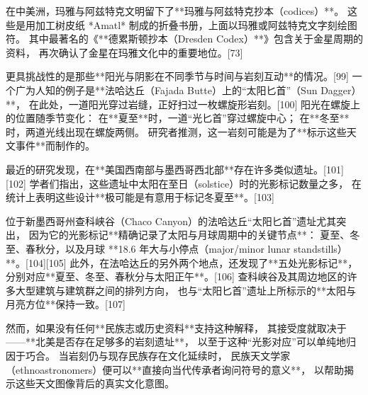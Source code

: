 在中美洲，玛雅与阿兹特克文明留下了**玛雅与阿兹特克抄本（codices）**。
这些是用加工树皮纸 *Amatl* 制成的折叠书册，上面以玛雅或阿兹特克文字刻绘图符。
其中最著名的《**德累斯顿抄本（Dresden Codex）**》包含关于金星周期的资料，
再次确认了金星在玛雅文化中的重要地位。[73]

更具挑战性的是那些**阳光与阴影在不同季节与时间与岩刻互动**的情况。[99]
一个广为人知的例子是**法哈达丘（Fajada Butte）上的“太阳匕首”（Sun Dagger）**，
在此处，一道阳光穿过岩缝，正好扫过一枚螺旋形岩刻。[100]
阳光在螺旋上的位置随季节变化：
在**夏至**时，一道“光匕首”穿过螺旋中心；
在**冬至**时，两道光线出现在螺旋两侧。
研究者推测，这一岩刻可能是为了**标示这些天文事件**而制作的。

最近的研究发现，在**美国西南部与墨西哥西北部**存在许多类似遗址。[101][102]
学者们指出，这些遗址中太阳在至日（solstice）时的光影标记数量之多，
在统计上表明这些设计**极可能是有意用于标记冬夏至**。[103]

位于新墨西哥州查科峡谷（Chaco Canyon）的法哈达丘“太阳匕首”遗址尤其突出，
因为它的光影标记**精确记录了太阳与月球周期中的关键节点**：
夏至、冬至、春秋分，以及月球 **18.6 年大与小停点（major/minor lunar standstills）**。[104][105]
此外，在法哈达丘的另外两个地点，还发现了**五处光影标记**，
分别对应**夏至、冬至、春秋分与太阳正午**。[106]
查科峡谷及其周边地区的许多大型建筑与建筑群之间的排列方向，
也与“太阳匕首”遗址上所标示的**太阳与月亮方位**保持一致。[107]

然而，如果没有任何**民族志或历史资料**支持这种解释，
其接受度就取决于——**北美是否存在足够多的岩刻遗址**，
以至于这种“光影对应”可以单纯地归因于巧合。
当岩刻仍与现存民族存在文化延续时，
民族天文学家（ethnoastronomers）便可以**直接向当代传承者询问符号的意义**，
以帮助揭示这些天文图像背后的真实文化意图。
